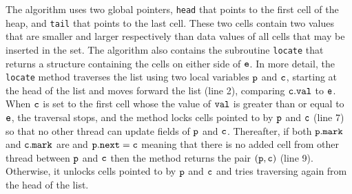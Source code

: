 % 
The algorithm uses two global pointers, {\tt head} that points to  the first cell of the heap, and {\tt tail} that points to the last cell.  
These two cells contain two values that are smaller 
and larger respectively than data values of all cells that may be                     
inserted in the set. The algorithm also contains the subroutine {\tt locate} that returns a structure containing the cells on either side of $\tt e$. In more detail, the {\tt locate} method traverses the list using two local variables ${\tt p}$ and $\tt c$, starting at the head of the list and moves forward the list (line 2), comparing ${\tt c.val}$ to ${\tt e}$. When $\tt c$ is set to the
first cell whose the value of  $\tt val$ is greater than or equal to $\tt e$, the traversal stops, and the
method locks cells pointed to by $\tt p$ and $\tt c$ (line 7) so that no other thread can update fields of $\tt p$ and $\tt c$. Thereafter, if both $\tt p.mark$ and $\tt c.mark$ are \false \; and ${\tt p.next = c}$ meaning that there is no added cell from other thread between $\tt p$ and $\tt c$ then the method returns the pair $\tt (p,c)$ (line 9). Otherwise, it unlocks cells pointed to by $\tt p$ and $\tt c$ and tries traversing again from the head of the list.


